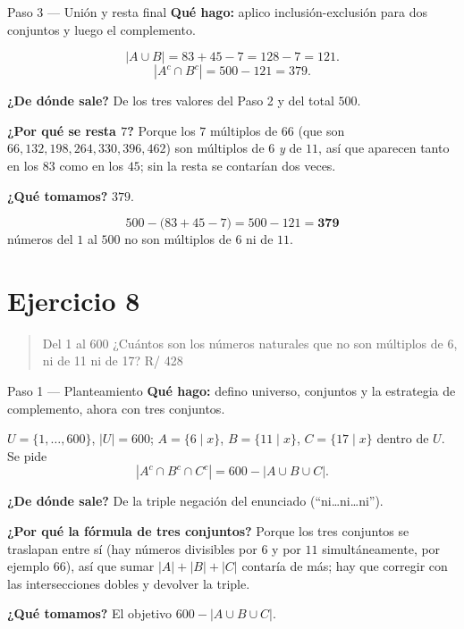 \documentclass[11pt]{article}
\begin{document}
\begin{paso}{Paso 3 --- Unión y resta final}
\textbf{Qué hago:} aplico inclusión-exclusión para dos conjuntos y luego el complemento.

\[
|A\cup B| = 83+45-7 = 128-7 = 121 .
\]
\[
|A^c\cap B^c| = 500-121 = 379 .
\]

\textbf{¿De dónde sale?} De los tres valores del Paso 2 y del total $500$.

\textbf{¿Por qué se resta $7$?} Porque los $7$ múltiplos de $66$ (que son $66,132,198,264,330,396,462$) son múltiplos de $6$ \emph{y} de $11$, así que aparecen tanto en los $83$ como en los $45$; sin la resta se contarían dos veces.

\textbf{¿Qué tomamos?} $379$.
\end{paso}

\begin{resp}
\[
500-\bigl(83+45-7\bigr) = 500-121 = \mathbf{379}
\]
números del $1$ al $500$ no son múltiplos de $6$ ni de $11$.
\end{resp}

\section*{Ejercicio 8}

\begin{quote}
Del 1 al 600 ¿Cuántos son los números naturales que no son múltiplos de 6, ni de 11 ni de 17? \hfill R/ 428
\end{quote}

\begin{paso}{Paso 1 --- Planteamiento}
\textbf{Qué hago:} defino universo, conjuntos y la estrategia de complemento, ahora con tres conjuntos.

$U=\{1,\dots,600\}$, $|U|=600$; $A=\{6\mid x\}$, $B=\{11\mid x\}$, $C=\{17\mid x\}$ dentro de $U$. Se pide
\[
|A^{c}\cap B^{c}\cap C^{c}| = 600 - |A\cup B\cup C| .
\]

\textbf{¿De dónde sale?} De la triple negación del enunciado (``ni\dots ni\dots ni'').

\textbf{¿Por qué la fórmula de tres conjuntos?} Porque los tres conjuntos se traslapan entre sí (hay números divisibles por $6$ y por $11$ simultáneamente, por ejemplo $66$), así que sumar $|A|+|B|+|C|$ contaría de más; hay que corregir con las intersecciones dobles y devolver la triple.

\textbf{¿Qué tomamos?} El objetivo $600-|A\cup B\cup C|$.
\end{paso}
\end{document}
